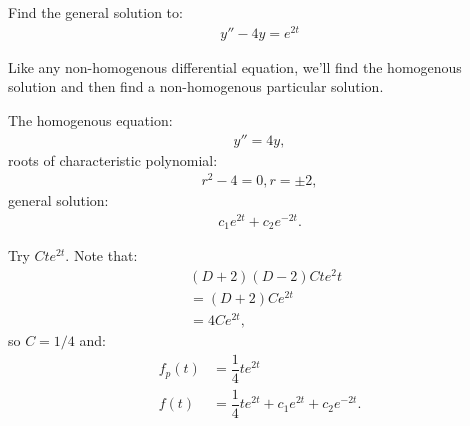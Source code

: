 \documentclass[11pt]{article}
\begin{document}
    \newpage \setcounter{equation}{-1} \begin{problem} 
        Find the general solution to:
        \begin{align}
            y'' - 4y = e^{2t}
        \end{align}
    \end{problem}
        \begin{remark}[Method.]
            Like any non-homogenous differential equation, we'll find the homogenous solution and then find a non-homogenous particular solution.
        \end{remark}
        \begin{solution}[Solution 2bi]
            The homogenous equation:
            \begin{align}
                y'' = 4y,
            \end{align}
            roots of characteristic polynomial:
            \begin{align}
                r^2-4 = 0, r = \pm 2,
            \end{align}
            general solution:
            \begin{align}
                c_1e^{2t} + c_2e^{-2t}.
            \end{align}
        \end{solution}
        \begin{solution}
            Try $Cte^{2t}$. Note that:
            \begin{align}
                & (D+2)(D-2)Cte^2t \\
                &= (D+2)Ce^{2t} \\
                &= 4Ce^{2t},
            \end{align}
            so $C = 1/4$ and:
            \begin{align}
                f_p(t) &= \dfrac{1}{4}te^{2t} \\
                f(t) &= \dfrac{1}{4}te^{2t} + c_1e^{2t} + c_2e^{-2t}.
            \end{align}
        \end{solution}
\end{document}
